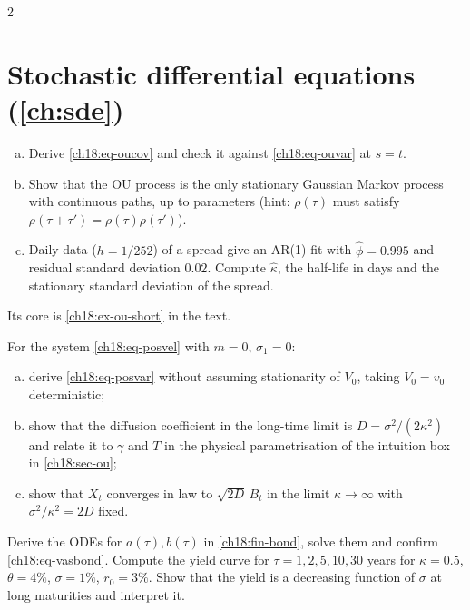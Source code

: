 \begin{paracol}{2}
\section{Stochastic differential equations (\cref{ch:sde})}\label{exam:ch18}

\begin{exercise}\label{ch18:ex-ou}
\leavevmode
\begin{enumerate}[(a)]
  \item Derive \eqref{ch18:eq-oucov} and check it against \eqref{ch18:eq-ouvar} at $s=t$.
  \item Show that the OU process is the only stationary Gaussian Markov process with continuous paths, up to parameters (hint: $\rho(\tau)$ must satisfy $\rho(\tau+\tau')=\rho(\tau)\rho(\tau')$).
  \item Daily data ($h=1/252$) of a spread give an AR(1) fit with $\hat\phi=0.995$ and residual standard deviation $0.02$. Compute $\hat\kappa$, the half-life in days and the stationary standard deviation of the spread.
\end{enumerate}
Its core is \cref{ch18:ex-ou-short} in the text.
\end{exercise}

\begin{exercise}\label{ch18:ex-posvel}
For the system \eqref{ch18:eq-posvel} with $m=0$, $\sigma_1=0$:
\begin{enumerate}[(a)]
  \item derive \eqref{ch18:eq-posvar} without assuming stationarity of $V_0$, taking $V_0=v_0$ deterministic;
  \item show that the diffusion coefficient in the long-time limit is $D=\sigma^2/(2\kappa^2)$ and relate it to $\gamma$ and $T$ in the physical parametrisation of the intuition box in \cref{ch18:sec-ou};
  \item show that $X_t$ converges in law to $\sqrt{2D}\,B_t$ in the limit $\kappa\to\infty$ with $\sigma^2/\kappa^2=2D$ fixed.
\end{enumerate}
\end{exercise}

\begin{exercise}\label{ch18:ex-vasbond}
Derive the ODEs for $a(\tau),b(\tau)$ in \cref{ch18:fin-bond}, solve them and confirm \eqref{ch18:eq-vasbond}. Compute the yield curve for $\tau=1,2,5,10,30$ years for $\kappa=0.5$, $\theta=4\%$, $\sigma=1\%$, $r_0=3\%$. Show that the yield is a decreasing function of $\sigma$ at long maturities and interpret it.
\end{exercise}


\end{paracol}
